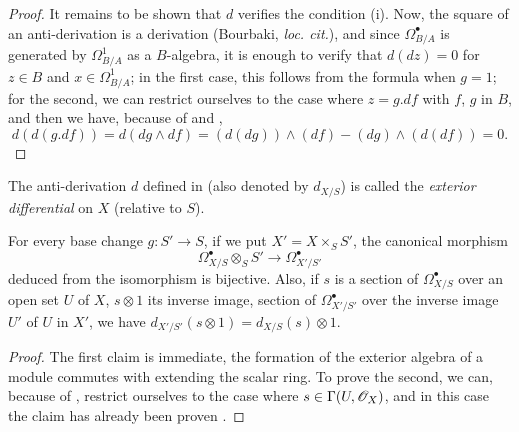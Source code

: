 \begin{proof}
It remains to be shown that $d$ verifies the condition \rm{(i)}.
Now, the square of an anti-derivation is a derivation (Bourbaki, \emph{loc. cit.}), and since $\Omega_{B/A}^\bullet$ is generated by $\Omega_{B/A}^1$ as a $B$-algebra, it is enough to verify that $d(dz) = 0$ for $z \in B$ and $x \in \Omega_{B/A}^1$;
in the first case, this follows from the formula  when $g = 1$;
for the second, we can restrict ourselves to the case where $z = g.df$ with $f$, $g$ in $B$, and then we have, because of  and , 
\[
  d(d(g.df)) = d(dg \wedge df) = (d(dg)) \wedge (df) - (dg) \wedge (d(df)) = 0.
\] 
\end{proof}

\begin{definition}[16.6.3]
\label{IV.16.6.3}
The anti-derivation $d$ defined in  (also denoted by $d_{X/S}$) is called the \emph{exterior differential} on $X$ (relative to $S$). 
\end{definition}

\begin{proposition}[16.6.4]
\label{IV.16.6.4}
For every base change $g:S' \to S$, if we put $X' = X \times_S S'$, the canonical morphism
\[
  \label{IV.16.6.4.1}
  \Omega_{X/S}^\bullet \otimes_S S' \to \Omega_{X'/S'}^\bullet
  \tag{16.6.4.1}
\]
deduced from the isomorphism  is bijective.
Also, if $s$ is a section of $\Omega_{X/S}^\bullet$ over an open set $U$ of $X$, $s \otimes 1$ its inverse image, section of $\Omega_{X'/S'}^\bullet$ over the inverse image $U'$ of $U$ in $X'$, we have $d_{X'/S'}(s \otimes 1) = d_{X/S}(s) \otimes 1$.
\end{proposition}

\begin{proof}
The first claim is immediate, the formation of the exterior algebra of a module commutes with extending the scalar ring.
To prove the second, we can, because of , restrict ourselves to the case where $s \in \Gamma(U, \mathscr{O}_X)$, and in this case the claim has already been proven .
\end{proof}

